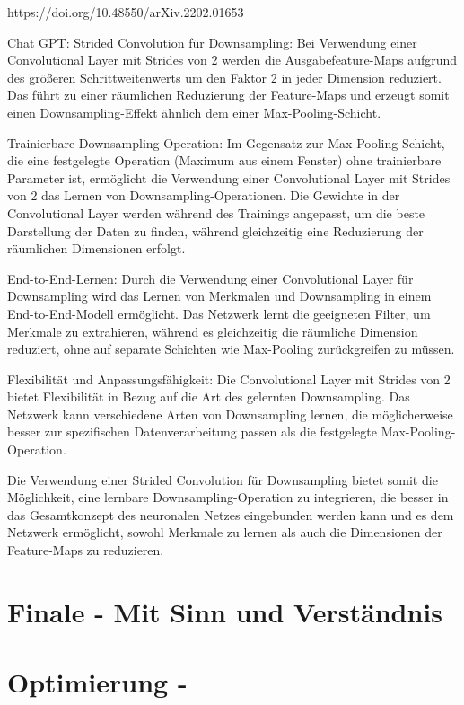 \documentclass[
fontsize=12pt,					%
paper=a4,						%
twoside=true, 					%
listof=totoc, 					%
bibliography=totoc,				%
titlepage, 						%
headsepline, 					%
DIV=12,							%
BCOR=6mm,						%
cleardoublepage=empty,			%
parskip,							%
ngerman
]{scrartcl}
\begin{document}
https://doi.org/10.48550/arXiv.2202.01653 

Chat GPT:
Strided Convolution für Downsampling: Bei Verwendung einer Convolutional Layer mit Strides von 2 werden die Ausgabefeature-Maps aufgrund des größeren Schrittweitenwerts um den Faktor 2 in jeder Dimension reduziert. Das führt zu einer räumlichen Reduzierung der Feature-Maps und erzeugt somit einen Downsampling-Effekt ähnlich dem einer Max-Pooling-Schicht.

Trainierbare Downsampling-Operation: Im Gegensatz zur Max-Pooling-Schicht, die eine festgelegte Operation (Maximum aus einem Fenster) ohne trainierbare Parameter ist, ermöglicht die Verwendung einer Convolutional Layer mit Strides von 2 das Lernen von Downsampling-Operationen. Die Gewichte in der Convolutional Layer werden während des Trainings angepasst, um die beste Darstellung der Daten zu finden, während gleichzeitig eine Reduzierung der räumlichen Dimensionen erfolgt.

End-to-End-Lernen: Durch die Verwendung einer Convolutional Layer für Downsampling wird das Lernen von Merkmalen und Downsampling in einem End-to-End-Modell ermöglicht. Das Netzwerk lernt die geeigneten Filter, um Merkmale zu extrahieren, während es gleichzeitig die räumliche Dimension reduziert, ohne auf separate Schichten wie Max-Pooling zurückgreifen zu müssen.

Flexibilität und Anpassungsfähigkeit: Die Convolutional Layer mit Strides von 2 bietet Flexibilität in Bezug auf die Art des gelernten Downsampling. Das Netzwerk kann verschiedene Arten von Downsampling lernen, die möglicherweise besser zur spezifischen Datenverarbeitung passen als die festgelegte Max-Pooling-Operation.

Die Verwendung einer Strided Convolution für Downsampling bietet somit die Möglichkeit, eine lernbare Downsampling-Operation zu integrieren, die besser in das Gesamtkonzept des neuronalen Netzes eingebunden werden kann und es dem Netzwerk ermöglicht, sowohl Merkmale zu lernen als auch die Dimensionen der Feature-Maps zu reduzieren.




\section{Finale - Mit Sinn und Verständnis}

\section{Optimierung - }
\end{document}
